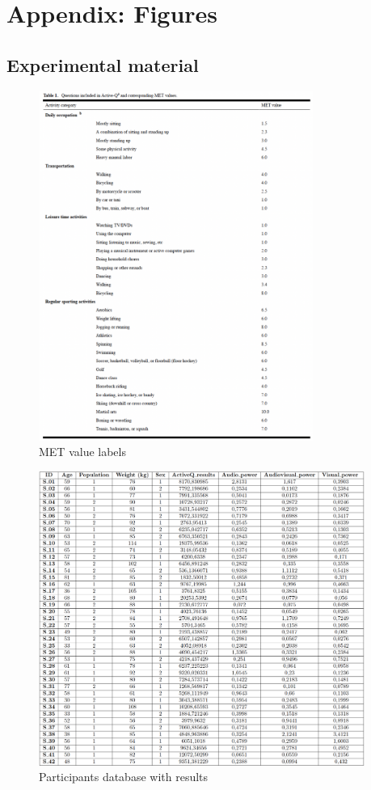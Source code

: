 \chapter*{Appendix: Figures}
\section*{Experimental material}
\begin{figure}[ht]
    \centering
    \includegraphics[width=0.8\textwidth]{appendix/met_values.png}
    \caption{MET value labels \parencite{Bonn_2012}}
    \label{fig: met_values}
\end{figure}
\begin{figure}[ht]
    \centering
    \includegraphics[width=0.95\textwidth]{appendix/database.png}
    \caption{Participants database with results}
    \label{fig: database}
\end{figure}
